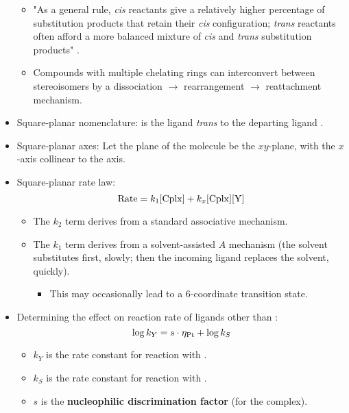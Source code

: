\documentclass[../notes.tex]{subfiles}
\begin{document}
\begin{itemize}
\begin{itemize}
        \item "As a general rule, \emph{cis} reactants give a relatively higher percentage of substitution products that retain their \emph{cis} configuration; \emph{trans} reactants often afford a more balanced mixture of \emph{cis} and \emph{trans} substitution products" \parencite[456]{bib:MiesslerFischerTarr}.
        \item Compounds with multiple chelating rings can interconvert between stereoisomers by a dissociation $\to$ rearrangement $\to$ reattachment mechanism.
    \end{itemize}
    \item Square-planar nomenclature:  is the ligand \emph{trans} to the departing ligand .
    \item Square-planar axes: Let the plane of the molecule be the $xy$-plane, with the $x$-axis collinear to the  axis.
    \item Square-planar rate law:
    \begin{equation*}
        \text{Rate} = k_1\ce{[Cplx]}+k_x\ce{[Cplx][Y]}
    \end{equation*}
    \begin{itemize}
        \item The $k_2$ term derives from a standard associative mechanism.
        \item The $k_1$ term derives from a solvent-assisted $A$ mechanism (the solvent substitutes first, slowly; then the incoming ligand replaces the solvent, quickly).
        \begin{itemize}
            \item This may occasionally lead to a 6-coordinate transition state.
        \end{itemize}
    \end{itemize}
    \item Determining the effect on reaction rate of ligands other than :
    \begin{equation*}
        \log k_Y = s\cdot\eta_{\ce{Pt}}+\log k_S
    \end{equation*}
    \begin{itemize}
        \item $k_Y$ is the rate constant for reaction with .
        \item $k_S$ is the rate constant for reaction with .
        \item $s$ is the \textbf{nucleophilic discrimination factor} (for the complex).
        \begin{itemize}

\end{itemize}
\end{itemize}
\end{itemize}
\end{document}
